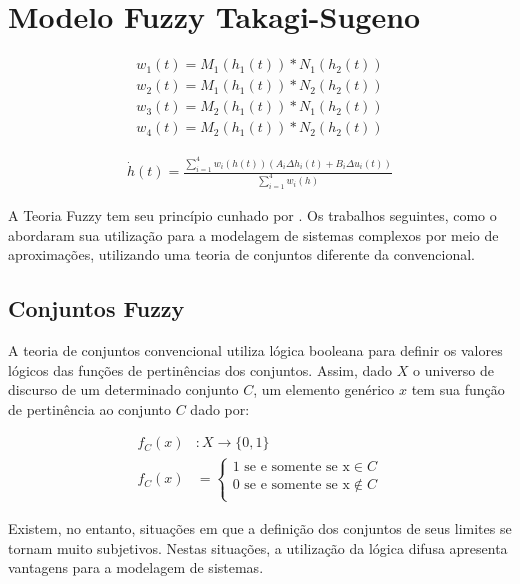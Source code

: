 \section{Modelo Fuzzy Takagi-Sugeno}
	\begin{equation}
	\begin{aligned}
		w_{1}(t) = M_1(h_1(t)) * N_1(h_2(t)) \\
		w_{2}(t) = M_1(h_1(t)) * N_2(h_2(t)) \\
		w_{3}(t) = M_2(h_1(t)) * N_1(h_2(t)) \\
		w_{4}(t) = M_2(h_1(t)) * N_2(h_2(t))
	\end{aligned}
	\end{equation}
	
	\begin{align}
		\dot{h}(t) = \frac{\sum_{i=1}^{4}  w_i(h(t))(A_i \Delta h_i(t) +  B_i \Delta u_i(t))}{\sum_{i=1}^{4} w_i(h)}
	\end{align}

\indent A Teoria Fuzzy tem seu princípio cunhado por \cite{zadeh65}. Os trabalhos seguintes, como o \cite{takagi_sugeno} abordaram sua utilização para a modelagem de sistemas complexos por meio de aproximações, utilizando uma teoria de conjuntos diferente da convencional.

\subsection{Conjuntos Fuzzy}
\indent A teoria de conjuntos convencional utiliza lógica booleana para definir os valores lógicos das funções de pertinências dos conjuntos. Assim, dado $X$ o universo de discurso de um determinado conjunto $C$, um elemento genérico $x$ tem sua função de pertinência ao conjunto $C$ dado por:

\begin{align*}
f_{C}(x)&:X \rightarrow \{0,1\} \quad \\
f_{C}(x)&= 
\begin{cases}
1 \text{ se e somente se x} \in C \\
0 \text{ se e somente se x} \notin C\\
\end{cases}
\end{align*}

Existem, no entanto, situações em que a definição dos conjuntos de seus limites se tornam muito subjetivos. Nestas situações, a utilização da lógica difusa apresenta vantagens para a modelagem de sistemas. 

